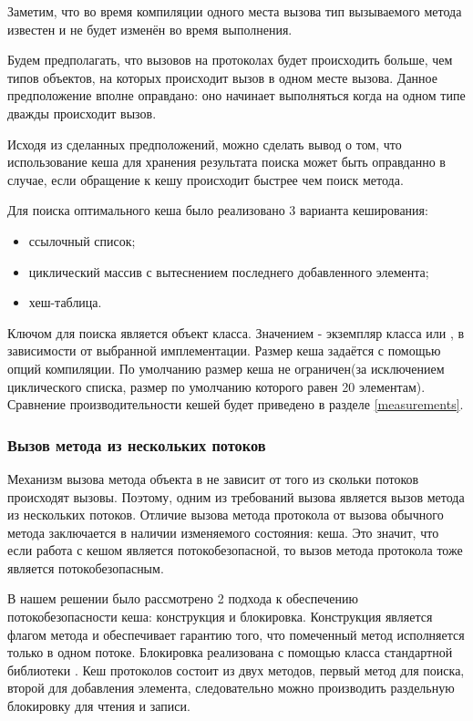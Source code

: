 Заметим, что во время компиляции одного места вызова тип вызываемого метода известен и не будет изменён во время выполнения.

Будем предполагать, что вызовов на протоколах будет происходить больше, чем типов объектов, на которых происходит вызов в одном месте вызова. Данное предположение вполне оправдано: оно начинает выполняться когда на одном типе дважды происходит вызов.

Исходя из сделанных предположений, можно сделать вывод о том, что использование кеша для хранения результата поиска может быть оправданно в случае, если обращение к кешу происходит быстрее чем поиск метода.

Для поиска оптимального кеша было реализовано 3 варианта кеширования:
\begin{itemize}
  \item ссылочный список;
  \item циклический массив с вытеснением последнего добавленного элемента;
  \item хеш-таблица.
\end{itemize}

Ключом для поиска является объект класса. Значением - экземпляр класса  или , в зависимости от выбранной имплементации. Размер кеша задаётся с помощью опций компиляции. По умолчанию размер кеша не ограничен(за исключением циклического списка, размер по умолчанию которого равен 20 элементам). Сравнение производительности кешей будет приведено в разделе \ref{measurements}.

\subsubsection{Вызов метода из нескольких потоков}
Механизм вызова метода объекта в  не зависит от того из скольки потоков происходят вызовы. Поэтому, одним из требований вызова является вызов метода из нескольких потоков. Отличие вызова метода протокола от вызова обычного метода заключается в наличии изменяемого состояния: кеша. Это значит, что если работа с кешом является потокобезопасной, то вызов метода протокола тоже является потокобезопасным.

В нашем решении было рассмотрено 2 подхода к обеспечению потокобезопасности кеша: \cite{jvm:sync} конструкция и  блокировка. Конструкция  является флагом метода и обеспечивает гарантию того, что помеченный метод исполняется только в одном потоке. Блокировка  реализована с помощью класса стандартной библиотеки \cite{jvm:rwlock}. Кеш протоколов состоит из двух методов, первый метод для поиска, второй для добавления элемента, следовательно можно производить раздельную блокировку для чтения и записи.

